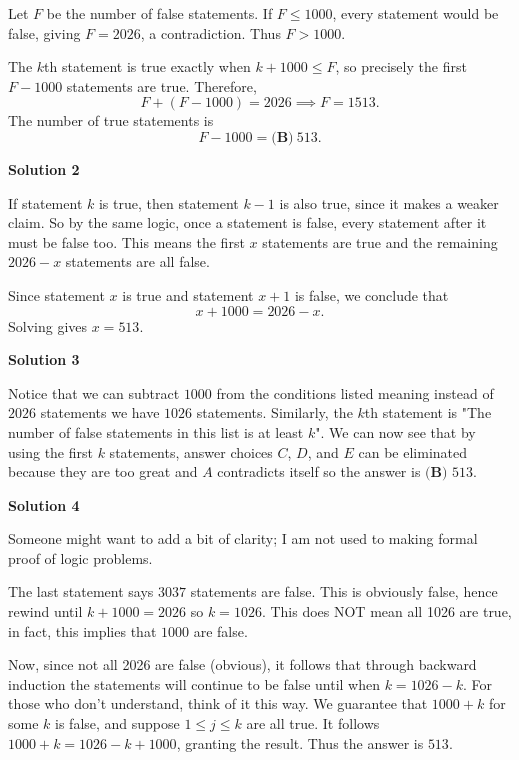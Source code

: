 \begin{enumerate}
Let $F$ be the number of false statements. If $F\le1000$, every statement would be false, giving $F=2026$, a contradiction. Thus $F>1000$.

 The $k$th statement is true exactly when $k+1000\le F$, so precisely the first $F-1000$ statements are true. Therefore,
 \[F+(F-1000)=2026\implies F=1513.\]The number of true statements is
 \[F-1000=\boxed{\textbf{(B)}\ 513}.\]




\textbf{Solution 2}

If statement $k$ is true, then statement $k - 1$ is also true, since it makes a weaker claim. So by the same logic, once a statement is false, every statement after it must be false too. This means the first $x$ statements are true and the remaining $2026 - x$ statements are all false.

 Since statement $x$ is true and statement $x + 1$ is false, we conclude that
 \[x + 1000 = 2026 - x.\]Solving gives $x = \boxed{513}$.

 



\textbf{Solution 3}

Notice that we can subtract $1000$ from the conditions listed meaning instead of $2026$ statements we have $1026$ statements. Similarly, the $k$th statement is "The number of false statements in this list is at least $k$". We can now see that by using the first $k$ statements, answer choices $C$, $D$, and $E$ can be eliminated because they are too great and $A$ contradicts itself so the answer is $\boxed{\textbf{(B) } 513}$.

 



\textbf{Solution 4}

Someone might want to add a bit of clarity; I am not used to making formal proof of logic problems.

 The last statement says $3037$ statements are false. This is obviously false, hence rewind until $k + 1000 = 2026$ so $k = 1026$. This does NOT mean all 1026 are true, in fact, this implies that $1000$ are false.

 Now, since not all 2026 are false (obvious), it follows that through backward induction the statements will continue to be false until when $k = 1026-k$. For those who don't understand,  think of it this way. We guarantee that $1000+k$ for some $k$ is false, and suppose $1 \leq j \leq k$ are all true. It follows $1000+k = 1026-k + 1000$, granting the result. Thus the answer is $\boxed{513}$.


\end{enumerate}
